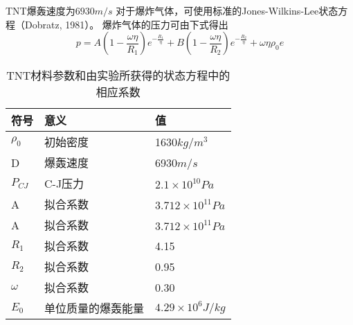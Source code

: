 \documentclass{article}
\begin{document}
TNT爆轰速度为$6930m/s$
对于爆炸气体，可使用标准的Jones-Wilkins-Lee状态方程（Dobratz, 1981）。
爆炸气体的压力可由下式得出
\begin{equation}
    \label{eq6.5}
    \tag{6.5}
    p = A \left(1-\frac{\omega \eta}{R_1}\right) e^{-\frac{R_1}{\eta}}
      + B \left(1-\frac{\omega \eta}{R_2}\right) e^{-\frac{R_2}{\eta}}
      + \omega \eta \rho_0 e
\end{equation}
\begin{table}[htbp]
    \centering
    \caption{TNT材料参数和由实验所获得的状态方程中的相应系数}\label{tab:table1}
    \begin{tabular}{P{2cm} P{5cm} P{5cm}}
        \hline
        符号 & 意义 & 值 \\ \hline
        $\rho_0$ & 初始密度 & 1630$kg/m^3$ \\
        D & 爆轰速度 & 6930$m/s$ \\
        $P_{CJ}$ & C-J压力 & $2.1\times10^10Pa$ \\
        A & 拟合系数 & $3.712\times10^11Pa$ \\
        A & 拟合系数 & $3.712\times10^11Pa$ \\
        $R_1$ & 拟合系数 & 4.15 \\
        $R_2$ & 拟合系数 & 0.95 \\
        $\omega$ & 拟合系数 & 0.30 \\
        $E_0$ & 单位质量的爆轰能量 & $4.29\times10^6J/kg$ \\ \hline
    \end{tabular}
\end{table}
\end{document}
